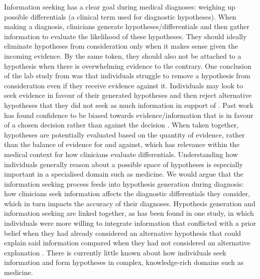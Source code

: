 \documentclass[a4paper, nobind]{templates/ociamthesis}
\begin{document}
Information seeking has a clear goal during medical diagnoses: weighing up possible differentials (a clinical term used for diagnostic hypotheses). When making a diagnosis, clinicians generate hypotheses/differentials and then gather information to evaluate the likelihood of these hypotheses. They should ideally eliminate hypotheses from consideration only when it makes sense given the incoming evidence. By the same token, they should also not be attached to a hypothesis when there is overwhelming evidence to the contrary. One conclusion of the lab study from \textcite{wason_failure_1960} was that individuals struggle to remove a hypothesis from consideration even if they receive evidence against it. Individuals may look to seek evidence in favour of their generated hypotheses and then reject alternative hypotheses that they did not seek as much information in support of \autocite{hunt_approach-induced_2016}. Past work has found confidence to be biased towards evidence/information that is in favour of a chosen decision rather than against the decision \autocite{peters_perceptual_2017}. When taken together, hypotheses are potentially evaluated based on the quantity of evidence, rather than the balance of evidence for and against, which has relevance within the medical context for how clinicians evaluate differentials. Understanding how individuals generally reason about a possible space of hypotheses is especially important in a specialised domain such as medicine. We would argue that the information seeking process feeds into hypothesis generation during diagnosis: how clinicians seek information affects the diagnostic differentials they consider, which in turn impacts the accuracy of their diagnoses. Hypothesis generation and information seeking are linked together, as has been found in one study, in which individuals were more willing to integrate information that conflicted with a prior belief when they had already considered an alternative hypothesis that could explain said information compared when they had not considered an alternative explanation \autocite{vallee-tourangeau_role_2000}. There is currently little known about how individuals seek information and form hypotheses in complex, knowledge-rich domains such as medicine.
\end{document}
